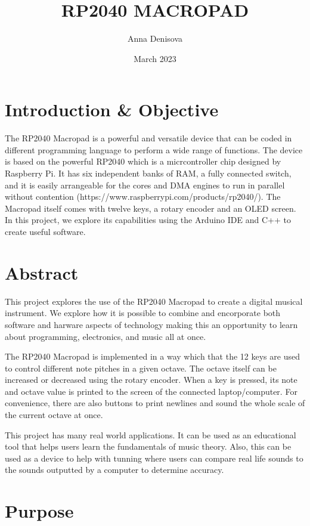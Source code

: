 \documentclass{article}
\title{RP2040 MACROPAD}
\author{Anna Denisova}
\date{March 2023}
\begin{document}
\maketitle
\tableofcontents

\newpage

\section{Introduction \& Objective}

The RP2040 Macropad is a powerful and versatile device that can be coded in different programming language to perform a wide range of functions. The device is based on the powerful RP2040 which is a micrcontroller chip designed by Raspberry Pi. It has six independent banks of RAM, a fully connected switch, and it is easily arrangeable for the cores and DMA engines to run in parallel without contention (https://www.raspberrypi.com/products/rp2040/). The Macropad itself comes with twelve keys, a rotary encoder and an OLED screen. In this project, we explore its capabilities using the Arduino IDE and C++ to create useful software. 

\section{Abstract}

This project explores the use of the RP2040 Macropad to create a digital musical instrument. We explore how it is possible to combine and encorporate both software and harware aspects of technology making this an opportunity to learn about programming, electronics, and music all at once. 

The RP2040 Macropad is implemented in a way which that the 12 keys are used to control different note pitches in a given octave. The octave itself can be increased or decreased using the rotary encoder. When a key is pressed, its note and octave value is printed to the screen of the connected laptop/computer. For convenience, there are also buttons to print newlines and sound the whole scale of the current octave at once.

This project has many real world applications. It can be used as an educational tool that helps users learn the fundamentals of music theory. Also, this can be used as a device to help with tunning where users can compare real life sounds to the sounds outputted by a computer to determine accuracy. 

\section{Purpose}
\end{document}

